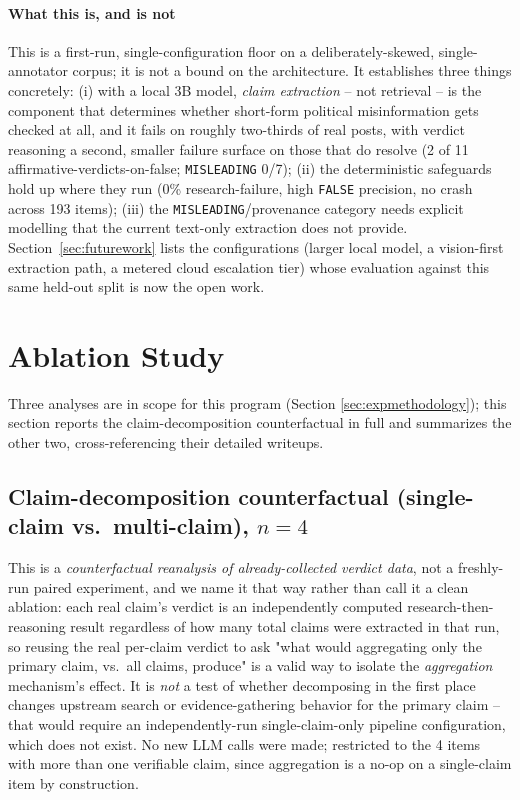 \documentclass[conference]{IEEEtran}
\begin{document}
\paragraph{What this is, and is not}
This is a first-run, single-configuration floor on a
deliberately-skewed, single-annotator corpus; it is not a bound on the
architecture. It establishes three things concretely: (i) with a local
3B model, \emph{claim extraction} -- not retrieval -- is the component
that determines whether short-form political misinformation gets checked
at all, and it fails on roughly two-thirds of real posts, with verdict
reasoning a second, smaller failure surface on those that do resolve
(2 of 11 affirmative-verdicts-on-false; \texttt{MISLEADING} 0/7); (ii) the deterministic safeguards hold up
where they run (0\% research-failure, high \texttt{FALSE} precision, no
crash across 193 items); (iii) the \texttt{MISLEADING}/provenance
category needs explicit modelling that the current text-only extraction
does not provide. Section~\ref{sec:futurework} lists the configurations
(larger local model, a vision-first extraction path, a metered cloud
escalation tier) whose evaluation against this same held-out split is
now the open work.

\section{Ablation Study}
\label{sec:ablation}

Three analyses are in scope for this program (Section
\ref{sec:expmethodology}); this section reports the claim-decomposition
counterfactual in full and summarizes the other two, cross-referencing
their detailed writeups.

\subsection{Claim-decomposition counterfactual (single-claim vs.\ multi-claim), $n=4$}
\label{sec:decompcounterfactual}
This is a \emph{counterfactual reanalysis of already-collected verdict
data}, not a freshly-run paired experiment, and we name it that way
rather than call it a clean ablation: each real claim's verdict is an
independently computed research-then-reasoning result regardless of how
many total claims were extracted in that run, so reusing the real
per-claim verdict to ask "what would aggregating only the primary claim,
vs.\ all claims, produce" is a valid way to isolate the
\emph{aggregation} mechanism's effect. It is \emph{not} a test of
whether decomposing in the first place changes upstream search or
evidence-gathering behavior for the primary claim -- that would require
an independently-run single-claim-only pipeline configuration, which
does not exist. No new LLM calls were made; restricted to the 4 items
with more than one verifiable claim, since aggregation is a no-op on a
single-claim item by construction.
\end{document}
